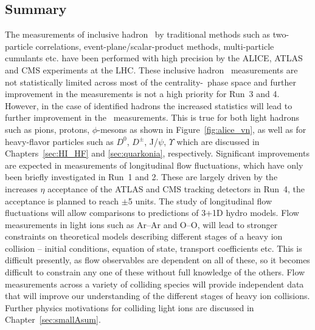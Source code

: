 \subsection{Summary}
The measurements of inclusive hadron \vn\ by traditional methods such as 
  two-particle correlations, event-plane/scalar-product methods, 
  multi-particle cumulants etc. have been performed with high precision 
  by the ALICE, ATLAS and CMS experiments at the LHC.
These inclusive hadron \vn\ measurements are not statistically limited 
  across most of the centrality-\pt\ phase space and further improvement 
  in the measurements is not a high priority for Run~3 and 4.
However, in the case of identified hadrons the increased statistics 
  will lead to further improvement in the \vn\ measurements.
This is true for both light hadrons such as pions, protons, $\phi$-mesons 
  as shown in Figure~\ref{fig:alice_vn}, as well as for heavy-flavor 
  particles such as $D^0$, $D^{\pm}$, J/$\psi$, $\Upsilon$ which are 
  discussed in Chapters~\ref{sec:HI_HF} and \ref{sec:quarkonia}, respectively.
%
Significant improvements are expected in measurements of 
  longitudinal flow fluctuations, which have only been briefly investigated
  in Run~1 and 2.
These are largely driven by the increases $\eta$ acceptance of the
  ATLAS and CMS tracking detectors in Run~4, the acceptance is planned 
  to reach $\pm$5 units.
The study of longitudinal flow fluctuations will allow comparisons to predictions 
  of 3+1D hydro models.
%
Flow measurements in light ions such as Ar--Ar and O--O, will lead 
  to stronger constraints on theoretical models describing different 
  stages of a heavy ion collision 
  -- initial conditions, equation of state, transport coefficients etc.
This is difficult presently, as flow observables are dependent 
  on all of these, so it becomes difficult to constrain any one of these 
  without full knowledge of the others.
Flow measurements across a variety of colliding species will provide independent 
  data that will improve our understanding of the different 
  stages of heavy ion collisions.
Further physics motivations for colliding light ions are discussed in Chapter~\ref{sec:smallAsum}.

